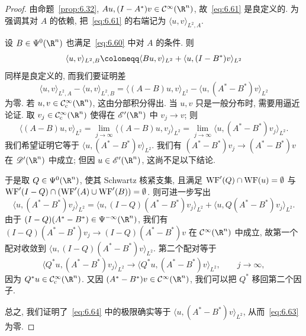 \begin{proof}
由命题~\ref{prop:6.32}, $A u, (I - A^*) v \in \Smooth(\R^n)$, 故~\eqref{eq:6.61} 是良定义的. 为强调其对 $A$ 的依赖, 把~\eqref{eq:6.61} 的右端记为 $\langle u, v \rangle_{L^2, A}$.

设 $B \in \Psi^0(\R^n)$ 也满足~\eqref{eq:6.60} 中对 $A$ 的条件. 则
\begin{equation}\label{eq:6.62}
    \langle u, v \rangle_{L^2, B} \defeq \langle B u, v \rangle_{L^2} + \langle u, (I - B^*) v \rangle_{L^2}
\end{equation}
同样是良定义的, 而我们要证明差
\begin{equation}\label{eq:6.63}
    \langle u, v \rangle_{L^2, A} - \langle u, v \rangle_{L^2, B} = \langle (A - B) u, v \rangle_{L^2} - \langle u, (A^* - B^*) v \rangle_{L^2}
\end{equation}
为零. 若 $u, v \in \SmoothComp(\R^n)$, 这由分部积分得出. 当 $u, v$ 只是一般分布时, 需要用逼近论证. 取 $v_j \in \SmoothComp(\R^n)$ 使得在 $\mathscr{E}'(\R^n)$ 中 $v_j \to v$; 则
\begin{equation}\label{eq:6.64}
    \langle (A - B) u, v \rangle_{L^2} = \lim_{j \to \infty} \langle (A - B) u, v_j \rangle_{L^2} = \lim_{j \to \infty} \langle u, (A^* - B^*) v_j \rangle_{L^2}.
\end{equation}
我们希望证明它等于 $\langle u, (A^* - B^*) v \rangle_{L^2}$. 我们有 $(A^* - B^*) v_j \to (A^* - B^*) v$ 在 $\Distr(\R^n)$ 中成立; 但因 $u \in \mathscr{E}'(\R^n)$, 这尚不足以下结论.

于是取 $Q \in \Psi^0(\R^n)$, 使其 Schwartz 核紧支集, 且满足 $\operatorname{WF}'(Q) \cap \operatorname{WF}(u) = \emptyset$ 与 $\operatorname{WF}'(I - Q) \cap (\operatorname{WF}'(A) \cup \operatorname{WF}'(B)) = \emptyset$. 则可进一步写出
\begin{equation}\label{eq:6.65}
    \langle u, (A^* - B^*) v_j \rangle_{L^2} = \langle u, (I - Q)(A^* - B^*) v_j \rangle_{L^2} + \langle u, Q(A^* - B^*) v_j \rangle_{L^2}.
\end{equation}
由于 $(I - Q)(A^* - B^*) \in \Psi^{-\infty}(\R^n)$, 我们有 $(I - Q)(A^* - B^*) v_j \to (I - Q)(A^* - B^*) v$ 在 $\Smooth(\R^n)$ 中成立, 故第一个配对收敛到 $\langle u, (I - Q)(A^* - B^*) v \rangle_{L^2}$. 第二个配对等于
\begin{equation}\label{eq:6.66}
    \langle Q^* u, (A^* - B^*) v_j \rangle_{L^2} \longrightarrow \langle Q^* u, (A^* - B^*) v \rangle_{L^2}, \qquad j \to \infty,
\end{equation}
因为 $Q^* u \in \SmoothComp(\R^n)$. 又因 $(A^* - B^*) v \in \Smooth(\R^n)$, 我们可以把 $Q^*$ 移回第二个因子.

总之, 我们证明了~\eqref{eq:6.64} 中的极限确实等于 $\langle u, (A^* - B^*) v \rangle_{L^2}$, 从而~\eqref{eq:6.63} 为零.
\end{proof}

